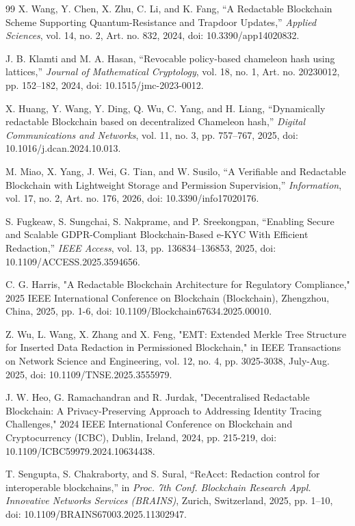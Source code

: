 \documentclass[lettersize,journal]{IEEEtran}
\begin{document}
\begin{thebibliography}{99}
    X. Wang, Y. Chen, X. Zhu, C. Li, and K. Fang,
    ``A Redactable Blockchain Scheme Supporting Quantum-Resistance and Trapdoor Updates,''
    \textit{Applied Sciences}, vol. 14, no. 2, Art. no. 832, 2024,
    doi: 10.3390/app14020832.
    
    J. B. Klamti and M. A. Hasan,
    ``Revocable policy-based chameleon hash using lattices,''
    \textit{Journal of Mathematical Cryptology}, vol. 18, no. 1, Art. no. 20230012,
    pp. 152--182, 2024,
    doi: 10.1515/jmc-2023-0012.
    
    X. Huang, Y. Wang, Y. Ding, Q. Wu, C. Yang, and H. Liang,
    ``Dynamically redactable Blockchain based on decentralized Chameleon hash,''
    \textit{Digital Communications and Networks}, vol. 11, no. 3, pp. 757--767, 2025,
    doi: 10.1016/j.dcan.2024.10.013.
    
    M. Miao, X. Yang, J. Wei, G. Tian, and W. Susilo,
    ``A Verifiable and Redactable Blockchain with Lightweight Storage and Permission Supervision,''
    \textit{Information}, vol. 17, no. 2, Art. no. 176, 2026,
    doi: 10.3390/info17020176.
    
    S. Fugkeaw, S. Sungchai, S. Nakprame, and P. Sreekongpan,
    ``Enabling Secure and Scalable GDPR-Compliant Blockchain-Based e-KYC With Efficient Redaction,''
    \textit{IEEE Access}, vol. 13, pp. 136834--136853, 2025,
    doi: 10.1109/ACCESS.2025.3594656.
    
    
    C. G. Harris, "A Redactable Blockchain Architecture for Regulatory Compliance," 2025 IEEE International Conference on Blockchain (Blockchain), Zhengzhou, China, 2025, pp. 1-6, doi: 10.1109/Blockchain67634.2025.00010.
    
    Z. Wu, L. Wang, X. Zhang and X. Feng, "EMT: Extended Merkle Tree Structure for Inserted Data Redaction in Permissioned Blockchain," in IEEE Transactions on Network Science and Engineering, vol. 12, no. 4, pp. 3025-3038, July-Aug. 2025, doi: 10.1109/TNSE.2025.3555979.
    
    J. W. Heo, G. Ramachandran and R. Jurdak, "Decentralised Redactable Blockchain: A Privacy-Preserving Approach to Addressing Identity Tracing Challenges," 2024 IEEE International Conference on Blockchain and Cryptocurrency (ICBC), Dublin, Ireland, 2024, pp. 215-219, doi: 10.1109/ICBC59979.2024.10634438.
    
    
    T. Sengupta, S. Chakraborty, and S. Sural,
    ``ReAcct: Redaction control for interoperable blockchains,''
    in \textit{Proc. 7th Conf. Blockchain Research Appl. Innovative
    Networks Services (BRAINS)}, Zurich, Switzerland, 2025,
    pp. 1--10, doi: 10.1109/BRAINS67003.2025.11302947.
    

\end{thebibliography}
\end{document}

